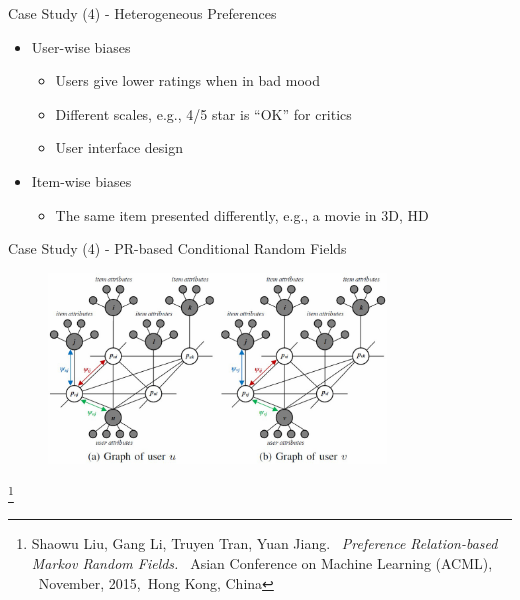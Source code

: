 \documentclass[
 size=14pt,
 paper=smartboard,  %
 mode=present, 		%
 display=slides, 	%
 style=tuliplab,  	%
 pauseslide,
 fleqn,leqno]{powerdot}
\begin{document}
\begin{slide}[toc=,bm=]{Case Study (4) - Heterogeneous Preferences}

\begin{itemize}
\item
User-wise biases

\begin{itemize}
\item
Users give lower ratings when in bad mood

\item
Different scales, e.g., 4/5 star is ``OK'' for critics

\item
User interface design

\end{itemize}

\item
Item-wise biases

\begin{itemize}
\item
The same item presented differently,
e.g., a movie in 3D, HD

\end{itemize}
\end{itemize}
\end{slide}


\begin{slide}[toc=,bm=]{Case Study (4) - PR-based Conditional Random Fields}

\begin{figure}
	\includegraphics[width=0.8\textwidth]{figures//theme3//Theme3_5_1.eps}
\end{figure}

\footnote{Shaowu Liu, Gang Li, Truyen Tran, Yuan Jiang. 
\emph{Preference Relation-based Markov Random Fields. }
Asian Conference on Machine Learning (ACML),  November, 2015, Hong Kong, China}

\end{slide}
\end{document}
